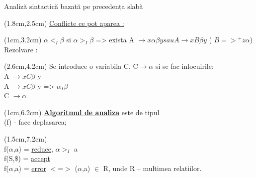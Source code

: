 \documentclass[pdf]{beamer}
\begin{document}
\begin{frame}{Analiză sintactică bazată pe precedența slabă}

\begin{textblock*}{16.8cm}(1.8cm,2.5cm)
\color{red}\underline{ Conflicte ce pot aparea :}
\end{textblock*}

\begin{textblock*}{16.8cm}(1cm,3.2cm)
\color{blue} $\alpha <_{I} \beta$ si $\alpha >_{I} \beta$
\color{black} {=>} exista A $\rightarrow  x \alpha\beta y sau A \rightarrow  xB \beta y $
( $B{=>}^+z\alpha$)
\\ {Rezolvare : }
\end{textblock*}

\begin{textblock*}{16.8cm}(2.6cm,4.2cm)
{Se introduce o variabila C,}
\color{red} {C$\rightarrow \alpha$}
\color{black} si se fac inlocuirile:
\\A $\rightarrow xC \beta$ y
\\A $\rightarrow xC\beta$ y  {   =>} $\alpha _{I} \beta$
\\C $\rightarrow \alpha$
\end{textblock*}

\begin{textblock*}{16.8cm}(1cm,6.2cm)
\color{red} \textbf{ \underline {Algoritmul de analiza}} 
\color {black} {este de tipul}
\color{red}{“deplaseaza - reduce”}
\\ \color{blue} {(f) - face deplasarea;}
\end{textblock*}

\begin{textblock*}{16.8cm}(1.5cm,7.2cm)
\\ \color{black} {f($\alpha$,a) = \underline{reduce}, $\alpha >_{I}$ a }
\\ \color{black} {f(S,\$) = \underline{accept}}
\\ \color{black} {f($\alpha$,a) = \underline{error} $<$=$>$ ($\alpha$,a) $\in$ R, unde R – multimea relatiilor.}
\end{textblock*}
\end{frame}
\end{document}
